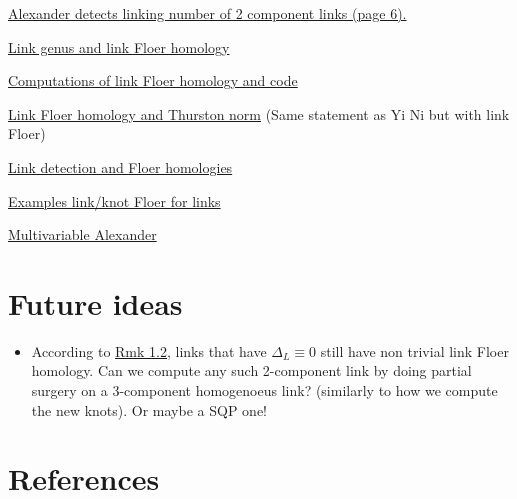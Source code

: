 \documentclass[11pt,e-only]{amsart}
\begin{document}
\href{https://msp.org/agt/2024/24-1/agt-v24-n1-p05-p.pdf}{Alexander detects linking number of 2 component links (page 6).} 

\href{https://www.its.caltech.edu/~yini/Published/LinkGenus.pdf}{Link genus and link Floer homology}

\href{https://d.lib.msu.edu/etd/52050?__goaway_challenge=header-refresh&__goaway_id=a2e9fb621b09544af78771ab27e5af18&__goaway_referer=https%3A%2F%2Fd.lib.msu.edu%2F}{Computations of link Floer homology and code}

\href{https://arxiv.org/pdf/math/0601618}{Link Floer homology and Thurston norm} (Same statement as Yi Ni but with link Floer)

\href{https://msp.org/agt/2024/24-1/agt-v24-n1-p05-p.pdf}{Link detection and Floer homologies}

\href{https://link.intlpress.com/JDetail/1806601803955335169}{Examples link/knot Floer for links}

\href{https://www.liverpool.ac.uk/~su14/papers/multiburau.pdf}{Multivariable Alexander}

\section{Future ideas}
\begin{itemize}
    \item According to \href{https://www.its.caltech.edu/~yini/Published/LinkGenus.pdf}{Rmk 1.2}, links that have $\Delta_L\equiv 0$ still have non trivial link Floer homology. Can we compute any such 2-component link by doing partial surgery on a 3-component homogenoeus link? (similarly to how we compute the new knots). Or maybe a SQP one!
\end{itemize}

\section*{References}
\printbibliography[heading=none]
\end{document}
